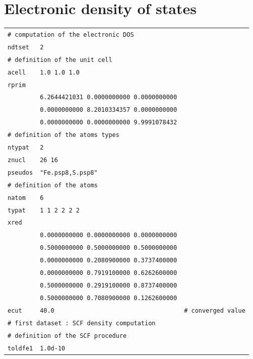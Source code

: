 \documentclass[11pt,a4paper]{article}
\begin{document}
\section{Electronic density of states}
\label{Abi8}
\begin{center}
\begin{tabular}{lll}
\multicolumn{3}{l}{\texttt{\# computation of the electronic DOS}}\\
\texttt{ndtset} & \texttt{2}&\\
\multicolumn{3}{l}{\texttt{\# definition of the unit cell}}\\
\texttt{acell} & \texttt{1.0 1.0 1.0}&\\
\texttt{rprim}&&\\
&\texttt{6.2644421031    0.0000000000    0.0000000000}&\\
&\texttt{0.0000000000    8.2010334357    0.0000000000}&\\
&\texttt{0.0000000000    0.0000000000    9.9991078432}&\\
\multicolumn{3}{l}{\texttt{\# definition of the atoms types}}\\
\texttt{ntypat}&\texttt{2}&\\
\texttt{znucl}&\texttt{26 16}&\\
\texttt{pseudos}&\texttt{"Fe.psp8,S.psp8"}&\\
\multicolumn{3}{l}{\texttt{\# definition of the atoms}}\\
\texttt{natom}&\texttt{6}&\\
\texttt{typat}&\texttt{1 1 2 2 2 2}&\\
\texttt{xred} &&\\
&\texttt{0.0000000000    0.0000000000    0.0000000000}&\\
&\texttt{0.5000000000    0.5000000000    0.5000000000}&\\
&\texttt{0.0000000000    0.2080900000    0.3737400000}&\\
&\texttt{0.0000000000    0.7919100000    0.6262600000}&\\
&\texttt{0.5000000000    0.2919100000    0.8737400000}&\\
&\texttt{0.5000000000    0.7080900000    0.1262600000}&\\
\texttt{ecut} &\texttt{40.0}&\texttt{\# converged value}\\
\multicolumn{3}{l}{\texttt{\# first dataset : SCF density computation}}\\
\multicolumn{3}{l}{\texttt{\# definition of the SCF procedure}}\\
\texttt{toldfe1}&\texttt{1.0d-10}&\\

\end{tabular}
\end{center}
\end{document}
